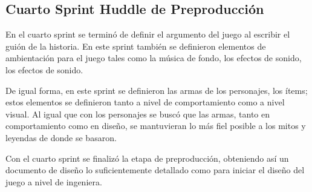 \subsection{Cuarto Sprint Huddle de Preproducción} 
En el cuarto sprint se terminó de definir el argumento del juego al escribir el 
guión de la historia. En este sprint también se definieron elementos de ambientación 
para el juego tales como la música de fondo, los efectos de sonido, los efectos 
de sonido. 
\\
\par
De igual forma, en este sprint se definieron las armas de los personajes, los 
ítems; estos elementos se definieron tanto a nivel de comportamiento como a nivel 
visual. Al igual que con los personajes se buscó que las armas, tanto en 
comportamiento como en diseño, se mantuvieran lo más fiel posible a los mitos 
y leyendas de donde se basaron.
\\
\par
Con el cuarto sprint se finalizó la etapa de preproducción, obteniendo así un 
documento de diseño lo suficientemente detallado como para iniciar el diseño 
del juego a nivel de ingeniera.
